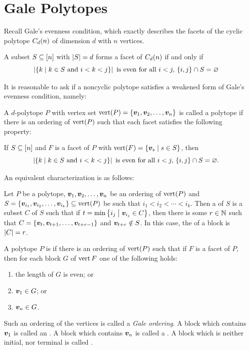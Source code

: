 \chapter{Gale Polytopes}
\label{chap:GalePolytopes}
Recall Gale's evenness condition, which exactly describes the facets of the cyclic polytope \(\cyc nd\) of dimension \(d\) with \(n\) vertices.
\begin{GEC}
    A subset \(S\sbset \brac n\) with \(\card S=d\) forms a facet of \(\cyc nd\) if and only if
        \[
            \card{\setb{k}{k\in S\text{ and }i<k<j}}\text{ is even for all } i<j,\, \seta{i,j}\cap S=\mt
        \]
\end{GEC}

It is reasonable to ask if a noncyclic polytope satisfies a weakened form of Gale's evenness condition, namely:
\begin{Definition}
    A \(d\)-polytope \(P\) with vertex set \(\vrt(P)=\seta{\ve v_1, \ve v_2\dc \ve v_n}\) is called a  polytope if there is an ordering of \(\vrt(P)\) such that each facet satisfies the following property:

    If \(S\sbset\brac n\) and \(F\) is a facet of \(P\) with \(\vrt(F)=\setb{\ve v_{s}}{s\in S}\), then
        \[
            \card{\setb{k}{k\in S\text{ and }i<k<j}}\text{ is even for all } i<j,\, \seta{i,j}\cap S=\mt.
        \]
\end{Definition}

An equivalent characterization is as follows:

Let \(P\) be a polytope,  \(\ve v_1, \ve v_2\dc\ve v_n\) be an ordering of \(\vrt(P)\) and \(S=\seta{\ve v_{i_1}, \ve v_{i_2}\dc \ve v_{i_k}}\sbset\vrt(P)\) be such that \(i_1<i_2<\dotsb<i_k\).  Then a  of \(S\) is a subset \(C\) of \(S\) such that if \(t=\min\setb{i_j}{\ve v_{i_j}\in C}\), then there is some \(r\in \N\) such that \(C=\seta{\ve v_t, \ve v_{t+1}\dc \ve v_{t+r-1}}\) and \(\ve v_{t+r}\notin S\).  In this case, the  of a block is \(\card{C}=r\).

\begin{Definition}
    A polytope \(P\) is  if there is an ordering of \(\vrt(P)\) such that if \(F\) is a facet of \(P\), then for each block \(G\) of \(\vrt F\)  one of the following holds:
        \begin{enumerate}
            \item   the length of \(G\) is even; or
            \item   \(\ve v_1\in G\); or
            \item   \(\ve v_n\in G\).
        \end{enumerate}
    Such an ordering of the vertices is called a \emph{Gale ordering}.  A block which contains \(\ve v_1\) is called an .  A block which contains \(\ve v_n\) is called a .  A block which is neither initial, nor terminal is called .
\end{Definition}

